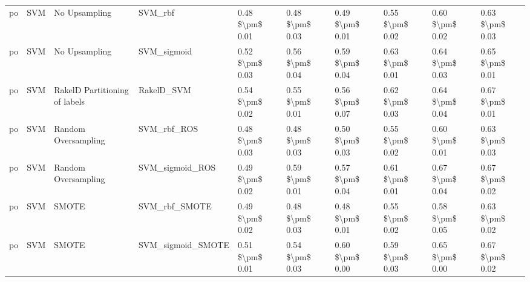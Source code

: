 \begin{tabular}{llllllllll}
      po &                             SVM &                 No Upsampling &                                      SVM\_rbf &     0.48 \$\textbackslash pm\$ 0.01 &           0.48 \$\textbackslash pm\$ 0.03 &       0.49 \$\textbackslash pm\$ 0.01 &        0.55 \$\textbackslash pm\$ 0.02 &                         0.60 \$\textbackslash pm\$ 0.02 & 0.63 \$\textbackslash pm\$ 0.03 \\
      po &                             SVM &                 No Upsampling &                                  SVM\_sigmoid &     0.52 \$\textbackslash pm\$ 0.03 &           0.56 \$\textbackslash pm\$ 0.04 &       0.59 \$\textbackslash pm\$ 0.04 &        0.63 \$\textbackslash pm\$ 0.01 &                         0.64 \$\textbackslash pm\$ 0.03 & 0.65 \$\textbackslash pm\$ 0.01 \\
      po &                             SVM & RakelD Partitioning of labels &                                   RakelD\_SVM &     0.54 \$\textbackslash pm\$ 0.02 &           0.55 \$\textbackslash pm\$ 0.01 &       0.56 \$\textbackslash pm\$ 0.07 &        0.62 \$\textbackslash pm\$ 0.03 &                         0.64 \$\textbackslash pm\$ 0.04 & 0.67 \$\textbackslash pm\$ 0.01 \\
      po &                             SVM &           Random Oversampling &                                  SVM\_rbf\_ROS &     0.48 \$\textbackslash pm\$ 0.03 &           0.48 \$\textbackslash pm\$ 0.03 &       0.50 \$\textbackslash pm\$ 0.03 &        0.55 \$\textbackslash pm\$ 0.02 &                         0.60 \$\textbackslash pm\$ 0.01 & 0.63 \$\textbackslash pm\$ 0.03 \\
      po &                             SVM &           Random Oversampling &                              SVM\_sigmoid\_ROS &     0.49 \$\textbackslash pm\$ 0.02 &           0.59 \$\textbackslash pm\$ 0.01 &       0.57 \$\textbackslash pm\$ 0.04 &        0.61 \$\textbackslash pm\$ 0.01 &                         0.67 \$\textbackslash pm\$ 0.04 & 0.67 \$\textbackslash pm\$ 0.02 \\
      po &                             SVM &                         SMOTE &                                SVM\_rbf\_SMOTE &     0.49 \$\textbackslash pm\$ 0.02 &           0.48 \$\textbackslash pm\$ 0.03 &       0.48 \$\textbackslash pm\$ 0.01 &        0.55 \$\textbackslash pm\$ 0.02 &                         0.58 \$\textbackslash pm\$ 0.05 & 0.63 \$\textbackslash pm\$ 0.02 \\
      po &                             SVM &                         SMOTE &                            SVM\_sigmoid\_SMOTE &     0.51 \$\textbackslash pm\$ 0.01 &           0.54 \$\textbackslash pm\$ 0.03 &       0.60 \$\textbackslash pm\$ 0.00 &        0.59 \$\textbackslash pm\$ 0.03 &                         0.65 \$\textbackslash pm\$ 0.00 & 0.67 \$\textbackslash pm\$ 0.02 \\

\end{tabular}
